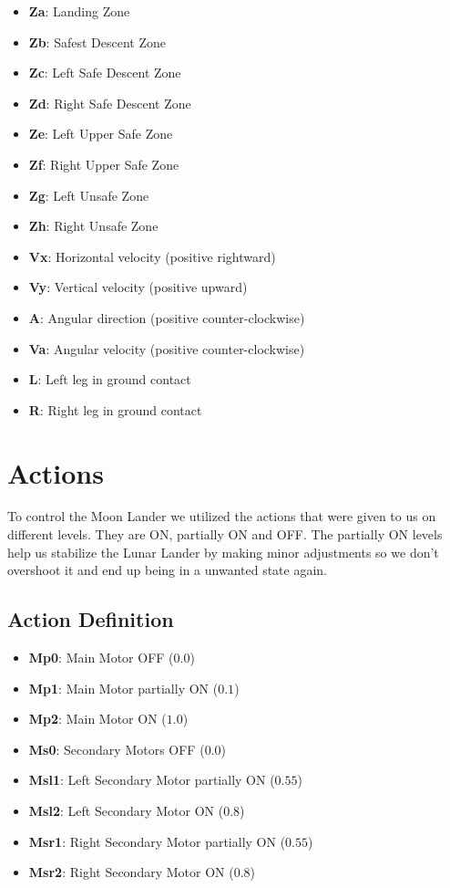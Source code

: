 \documentclass{article}
\begin{document}
\begin{itemize}
    \item \textbf{Za}: Landing Zone
    \item \textbf{Zb}: Safest Descent Zone
    \item \textbf{Zc}: Left Safe Descent Zone
    \item \textbf{Zd}: Right Safe Descent Zone
    \item \textbf{Ze}: Left Upper Safe Zone
    \item \textbf{Zf}: Right Upper Safe Zone
    \item \textbf{Zg}: Left Unsafe Zone
    \item \textbf{Zh}: Right Unsafe Zone
    \item \textbf{Vx}: Horizontal velocity (positive rightward)
    \item \textbf{Vy}: Vertical velocity (positive upward)
    \item \textbf{A}: Angular direction (positive counter-clockwise)
    \item \textbf{Va}: Angular velocity (positive counter-clockwise)
    \item \textbf{L}: Left leg in ground contact
    \item \textbf{R}: Right leg in ground contact
\end{itemize}

\section{Actions}
To control the Moon Lander we utilized the actions that were given to us on different levels. They are ON, partially ON and OFF. The partially ON levels help us stabilize the Lunar Lander by making minor adjustments so we don't overshoot it and end up being in a unwanted state again.
\subsection{Action Definition}
\begin{itemize}
    \item \textbf{Mp0}: Main Motor OFF ($0.0$)
    \item \textbf{Mp1}: Main Motor partially ON ($0.1$)
    \item \textbf{Mp2}: Main Motor ON ($1.0$)
    \item \textbf{Ms0}: Secondary Motors OFF ($0.0$)
    \item \textbf{Msl1}: Left Secondary Motor partially ON ($0.55$)
    \item \textbf{Msl2}: Left Secondary Motor ON ($0.8$)
    \item \textbf{Msr1}: Right Secondary Motor partially ON ($0.55$)
    \item \textbf{Msr2}: Right Secondary Motor ON ($0.8$)
\end{itemize}
\end{document}
